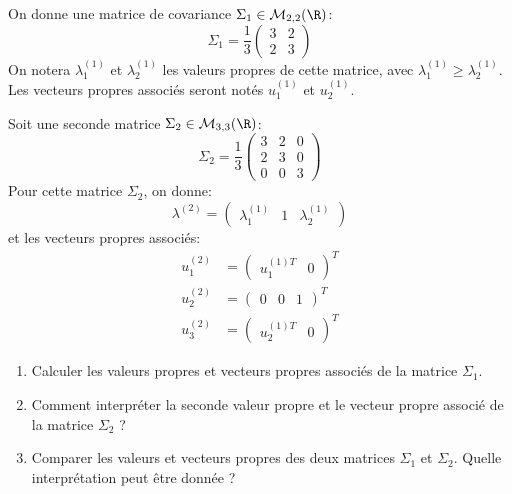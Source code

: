 \documentclass[solutions]{../exercices}
\begin{document}

	\begin{exercice}
		On donne une matrice de covariance $\Sigma_1 \in \mathcal{M}_{2,2}(\R)$:
		\begin{equation*}
			\Sigma_1 = \frac{1}{3}\begin{pmatrix}3 & 2 \\ 2 & 3 \end{pmatrix}
		\end{equation*}
		On notera $\lambda_1^{(1)}$ et $\lambda_2^{(1)}$ les valeurs propres de cette matrice, avec $\lambda_1^{(1)} \ge \lambda_2^{(1)}$.
		Les vecteurs propres associés seront notés $u_1^{(1)}$ et $u_2^{(1)}$.

		Soit une seconde matrice $\Sigma_2 \in \mathcal{M}_{3,3}(\R)$:
		\begin{equation*}
			\Sigma_2 = \frac{1}{3}\begin{pmatrix}3 & 2 & 0 \\ 2 & 3 & 0 \\ 0 & 0 & 3\end{pmatrix}
		\end{equation*}
		Pour cette matrice $\Sigma_2$, on donne:
		\begin{equation*}
			\lambda^{(2)} = \begin{pmatrix}\lambda_1^{(1)} & 1 & \lambda_2^{(1)}\end{pmatrix}
		\end{equation*}
		et les vecteurs propres associés:
		\begin{equation*}
			\begin{aligned}
				u_1^{(2)} &= \begin{pmatrix}u_1^{(1)T} & 0 \end{pmatrix}^T \\
				u_2^{(2)} &= \begin{pmatrix}0 & 0 & 1\end{pmatrix}^T \\
				u_3^{(2)} &= \begin{pmatrix}u_2^{(1)T} & 0 \end{pmatrix}^T
			\end{aligned}
		\end{equation*}
		\begin{enumerate}
			\item Calculer les valeurs propres et vecteurs propres associés de la matrice $\Sigma_1$.
			\item Comment interpréter la seconde valeur propre et le vecteur propre associé de la matrice $\Sigma_2$ ?
			\item Comparer les valeurs et vecteurs propres des deux matrices $\Sigma_1$ et $\Sigma_2$. Quelle interprétation peut être donnée ?
		\end{enumerate}
	\end{exercice}
\end{document}
